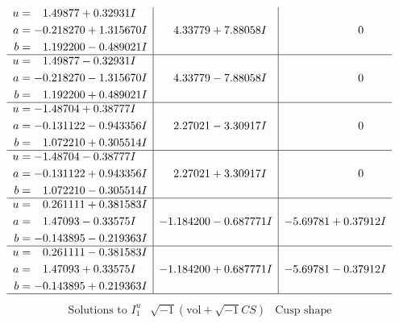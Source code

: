 \documentclass[1p]{elsarticle_modified}
\theoremstyle{definition}
\newcommand{\I}{\sqrt{-1}}
\begin{document}
$$\begin{array}{c|c|c}
\begin{aligned}
u &= \phantom{-}1.49877 + 0.32931 I \\
a &= -0.218270 + 1.315670 I \\
b &= \phantom{-}1.192200 - 0.489021 I\end{aligned}
 & \phantom{-}4.33779 + 7.88058 I & \phantom{-0.000000 } 0 \\ \hline\begin{aligned}
u &= \phantom{-}1.49877 - 0.32931 I \\
a &= -0.218270 - 1.315670 I \\
b &= \phantom{-}1.192200 + 0.489021 I\end{aligned}
 & \phantom{-}4.33779 - 7.88058 I & \phantom{-0.000000 } 0 \\ \hline\begin{aligned}
u &= -1.48704 + 0.38777 I \\
a &= -0.131122 - 0.943356 I \\
b &= \phantom{-}1.072210 + 0.305514 I\end{aligned}
 & \phantom{-}2.27021 - 3.30917 I & \phantom{-0.000000 } 0 \\ \hline\begin{aligned}
u &= -1.48704 - 0.38777 I \\
a &= -0.131122 + 0.943356 I \\
b &= \phantom{-}1.072210 - 0.305514 I\end{aligned}
 & \phantom{-}2.27021 + 3.30917 I & \phantom{-0.000000 } 0 \\ \hline\begin{aligned}
u &= \phantom{-}0.261111 + 0.381583 I \\
a &= \phantom{-}1.47093 - 0.33575 I \\
b &= -0.143895 - 0.219363 I\end{aligned}
 & -1.184200 - 0.687771 I & -5.69781 + 0.37912 I \\ \hline\begin{aligned}
u &= \phantom{-}0.261111 - 0.381583 I \\
a &= \phantom{-}1.47093 + 0.33575 I \\
b &= -0.143895 + 0.219363 I\end{aligned}
 & -1.184200 + 0.687771 I & -5.69781 - 0.37912 I\\
 \hline 
 \end{array}$$\newpage$$\begin{array}{c|c|c}  
\text{Solutions to }I^u_{1}& \I (\text{vol} + \sqrt{-1}CS) & \text{Cusp shape}\\
 \hline 
\begin{aligned}

\end{aligned}
\end{array}$$
\end{document}
